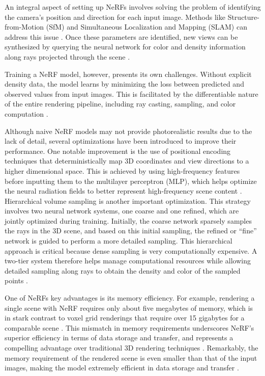 An integral aspect of setting up NeRFs involves solving the problem of identifying the camera's position and direction for each input image. Methods like Structure-from-Motion (SfM) and Simultaneous Localization and Mapping (SLAM) can address this issue \citep{wei2021nerfingmvs}. Once these parameters are identified, new views can be synthesized by querying the neural network for color and density information along rays projected through the scene \citep{gerats2023dynamic}. 

Training a NeRF model, however, presents its own challenges. Without explicit density data, the model learns by minimizing the loss between predicted and observed values from input images. This is facilitated by the differentiable nature of the entire rendering pipeline, including ray casting, sampling, and color computation \citep{yariv2020multiview}.

Although naive NeRF models may not provide photorealistic results due to the lack of detail, several optimizations have been introduced to improve their performance. One notable improvement is the use of positional encoding techniques that deterministically map 3D coordinates and view directions to a higher dimensional space. This is achieved by using high-frequency features before inputting them to the multilayer perceptron (MLP), which helps optimize the neural radiation fields to better represent high-frequency scene content \citep{mildenhallNERF}. Hierarchical volume sampling is another important optimization. This strategy involves two neural network systems, one coarse and one refined, which are jointly optimized during training. Initially, the coarse network sparsely samples the rays in the 3D scene, and based on this initial sampling, the refined or ``fine'' network is guided to perform a more detailed sampling. This hierarchical approach is critical because dense sampling is very computationally expensive. A two-tier system therefore helps manage computational resources while allowing detailed sampling along rays to obtain the density and color of the sampled points \citep{arandjelović2021nerf}.

One of NeRFs key advantages is its memory efficiency. For example, rendering a single scene with NeRF requires only about five megabytes of memory, which is in stark contrast to voxel grid renderings that require over 15 gigabytes for a comparable scene \citep{mildenhallNERF}. This mismatch in memory requirements underscores NeRF's superior efficiency in terms of data storage and transfer, and represents a compelling advantage over traditional 3D rendering techniques \citep{mildenhallNERF}. Remarkably, the memory requirement of the rendered scene is even smaller than that of the input images, making the model extremely efficient in data storage and transfer \citep{mildenhallNERF}.

